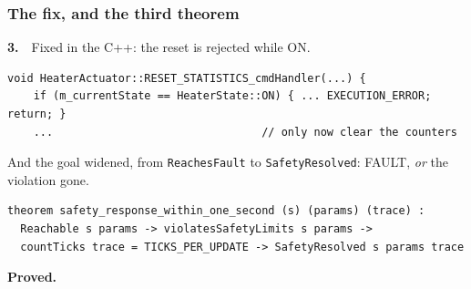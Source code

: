 \begin{frame}[fragile]
  \frametitle{The fix, and the third theorem} \small
{}

\vspace{-0.1cm}
{\bf 3.}\ \ Fixed in the C++: the reset is rejected while ON.

\vspace{0.1cm}
\begin{lstlisting}[style=cpp]
void HeaterActuator::RESET_STATISTICS_cmdHandler(...) {
    if (m_currentState == HeaterState::ON) { ... EXECUTION_ERROR; return; }
    ...                                // only now clear the counters
\end{lstlisting}

\pause
\vspace{0.15cm}

And the goal widened, from {\tt ReachesFault} to {\tt SafetyResolved}: FAULT, {\em or} the
violation gone.

\vspace{0.1cm}
\begin{lstlisting}[language=lean4]
theorem safety_response_within_one_second (s) (params) (trace) :
  Reachable s params -> violatesSafetyLimits s params ->
  countTicks trace = TICKS_PER_UPDATE -> SafetyResolved s params trace
\end{lstlisting}

\vspace{-0.05cm}
{\bf Proved.}

\end{frame}
